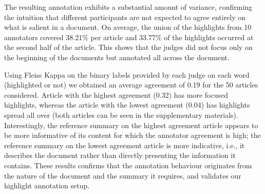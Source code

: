 \documentclass[11pt,a4paper]{article}
\begin{document}
The resulting annotation exhibits a substantial amount of variance, confirming the intuition that different participants are not expected to agree entirely on what is salient in a document. 
On average, the union of the highlights from 10 annotators covered 38.21\% per article and  33.77\% of the highlights occurred at the second half of the article. This shows that the judges did not focus only on the beginning of the documents but annotated all across the document.


Using Fleiss Kappa \citep{Josep1971} on the binary labels provided by each judge on each word (highlighted or not) we obtained an average agreement of 0.19 for the 50 articles considered. Article with the highest agreement (0.32) has more focused highlights, whereas the article with the lowest agreement (0.04) has highlights spread all over (both articles can be seen in the supplementary materials). Interestingly, the reference summary on the highest agreement article appears to be more informative of its content for which the annotator agreement is high; the reference summary on the lowest agreement article is more indicative, i.e., it describes the document rather than directly presenting the information it contains. These results confirms that the annotation behaviour originates from the nature of the document and the summary it requires, and validates our highlight annotation setup.


\end{document}
